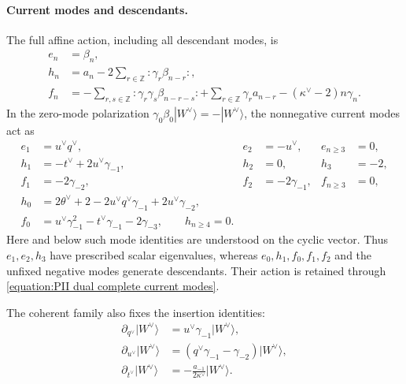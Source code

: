 \documentclass[a4paper,11pt]{article}
\numberwithin{equation}{section}
\begin{document}
\paragraph*{Current modes and descendants.}
\label{appendix:PII dual Wakimoto modes}
The full affine action, including all descendant modes, is
\begin{equation}
	\label{equation:PII dual complete current modes}
	\begin{aligned}
		e_{n}&=\beta_{n},\\
		h_{n}&=a_{n}-2\sum_{r\in\mathbb{Z}}:\gamma_{r}\beta_{n-r}:,\\
		f_{n}&=-\sum_{r,s\in\mathbb{Z}}:\gamma_{r}\gamma_{s}\beta_{n-r-s}:
		+\sum_{r\in\mathbb{Z}}\gamma_{r}a_{n-r}
		-(\kappa^{\vee}-2)n\gamma_{n}.
	\end{aligned}
\end{equation}
In the zero-mode polarization
$\gamma_{0}\beta_{0}|W^{\vee}\rangle=-|W^{\vee}\rangle$,
the nonnegative current modes act as
\begin{equation}
	\begin{aligned}
		e_{1}&=u^{\vee}q^{\vee},&
		e_{2}&=-u^{\vee},&
		e_{n\geq3}&=0,\\
		h_{1}&=-t^{\vee}+2u^{\vee}\gamma_{-1},&
		h_{2}&=0,&
		h_{3}&=-2,\\
		f_{1}&=-2\gamma_{-2},&
		f_{2}&=-2\gamma_{-1},&
		f_{n\geq3}&=0,\\
		h_{0}&=2\theta^{\vee}+2
		-2u^{\vee}q^{\vee}\gamma_{-1}+2u^{\vee}\gamma_{-2},\\
		f_{0}&=u^{\vee}\gamma_{-1}^{2}
		-t^{\vee}\gamma_{-1}-2\gamma_{-3},
		\qquad h_{n\geq4}=0.
	\end{aligned}
\end{equation}
Here and below such mode identities are understood on the cyclic
vector.  Thus $e_{1},e_{2},h_{3}$ have prescribed scalar eigenvalues,
whereas $e_{0},h_{1},f_{0},f_{1},f_{2}$ and the unfixed negative
modes generate descendants.  Their action is retained through
\eqref{equation:PII dual complete current modes}.

The coherent family also fixes the insertion identities:
\begin{equation}
	\label{equation:PII dual horizontal family}
	\begin{aligned}
		\partial_{q^{\vee}}|W^{\vee}\rangle
		&=u^{\vee}\gamma_{-1}|W^{\vee}\rangle,\\
		\partial_{u^{\vee}}|W^{\vee}\rangle
		&=(q^{\vee}\gamma_{-1}-\gamma_{-2})|W^{\vee}\rangle,\\
		\partial_{t^{\vee}}|W^{\vee}\rangle
		&=-\frac{a_{-1}}{2\kappa^{\vee}}|W^{\vee}\rangle.
	\end{aligned}
\end{equation}
\end{document}
